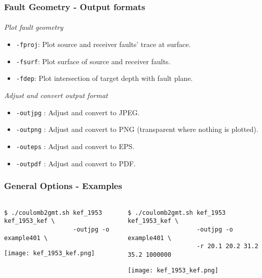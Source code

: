 \begin{frame}
  \frametitle{Fault Geometry - Output formats}
  \framesubtitle{}
  \label{fr4:hist_pics}

\emph{Plot fault geometry}

\begin{scriptsize}
\begin{itemize}
\item
  \texttt{-fproj}: Plot source and receiver faults' trace at surface.
\item
  \texttt{-fsurf}: Plot surface of source and receiver faults.
\item
  \texttt{-fdep}: Plot intersection of target depth with fault plane.
\end{itemize}
\end{scriptsize}

\emph{Adjust and convert output format}
\begin{scriptsize}
\begin{itemize}
\item
  \texttt{-outjpg} : Adjust and convert to JPEG.
\item
  \texttt{-outpng} : Adjust and convert to PNG (transparent where
  nothing is plotted).
\item
  \texttt{-outeps} : Adjust and convert to EPS.
\item
  \texttt{-outpdf} : Adjust and convert to PDF.
\end{itemize}
\end{scriptsize}
\end{frame}
\note{}

\begin{frame}[t,fragile]
  \frametitle{General Options - Examples}
  \framesubtitle{}
  \label{fr4:hist_pics}
\begin{columns}[t]
  \begin{column}{.5\textwidth}
\begin{scriptsize}
\begin{verbatim}
$ ./coulomb2gmt.sh kef_1953 kef_1953_kef \
                   -outjpg -o example401 \
\end{verbatim}
\end{scriptsize}
\centering
\texttt{[image: kef\_1953\_kef.png]}
  \end{column}
  \begin{column}{.5\textwidth}
  \begin{scriptsize}
\begin{verbatim}
$ ./coulomb2gmt.sh kef_1953 kef_1953_kef \
                   -outjpg -o example401 \
                   -r 20.1 20.2 31.2 35.2 1000000
\end{verbatim}
\end{scriptsize}
\centering
  \texttt{[image: kef\_1953\_kef.png]}
  \end{column}
\end{columns}

\end{frame}
\note{}

